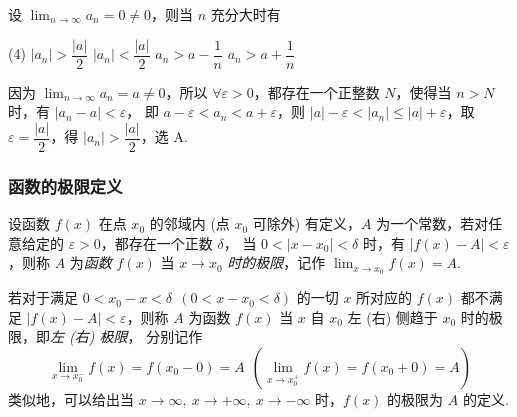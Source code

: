 \begin{example}[2014 数三]
    设 $\displaystyle\lim_{n\to\infty}a_n=0\neq 0$，则当 $n$ 充分大时有
    \begin{tasks}(4)
        \task $|a_n|>\dfrac{|a|}{2}$
        \task $|a_n|<\dfrac{|a|}{2}$
        \task $a_n>a-\dfrac{1}{n}$
        \task $a_n>a+\dfrac{1}{n}$
    \end{tasks}
\end{example}
\begin{solution}
    因为 $\displaystyle\lim_{n\to\infty}a_n=a\neq 0$，所以 $\forall\varepsilon>0$，都存在一个正整数 $N$，使得当 $n>N$ 时，有 $|a_n-a|<\varepsilon$，
    即 $a-\varepsilon<a_n<a+\varepsilon$，则 $|a|-\varepsilon<|a_n|\leqslant |a|+\varepsilon$，取 $\varepsilon=\dfrac{|a|}{2}$，得 $|a_n|>\dfrac{|a|}{2}$，选 A.
\end{solution}

\subsubsection{函数的极限定义}

\begin{definition}[函数的极限]
    设函数 $f(x)$ 在点 $x_0$ 的邻域内 (点 $x_0$ 可除外) 有定义，$A$ 为一个常数，若对任意给定的 $\varepsilon>0$，都存在一个正数 $\delta$，
    当 $0<|x-x_0|<\delta$ 时，有 $|f(x)-A|<\varepsilon$，则称 $A$ 为\textit{函数} $f(x)$ 当 $x\to x_0$ \textit{时的极限}，记作 $\displaystyle\lim_{x\to x_0}f(x)=A.$
\end{definition}

\begin{definition}[左右极限]
    若对于满足 $0<x_0-x<\delta~~(0<x-x_0<\delta)$ 的一切 $x$ 所对应的 $f(x)$ 都不满足 $|f(x)-A|<\varepsilon$，则称 $A$ 为函数 $f(x)$ 当 $x$ 自 $x_0$ 左 (右) 侧趋于 $x_0$ 时的极限，即\textit{左 (右) 极限}，
    分别记作 $$\lim_{x\to x_0^-}f(x)=f(x_0-0)=A~~(\lim_{x\to x_0^+}f(x)=f(x_0+0)=A)$$
    类似地，可以给出当 $x\to\infty,~x\to+\infty,~x\to-\infty$ 时，$f(x)$ 的极限为 $A$ 的定义.
\end{definition}

